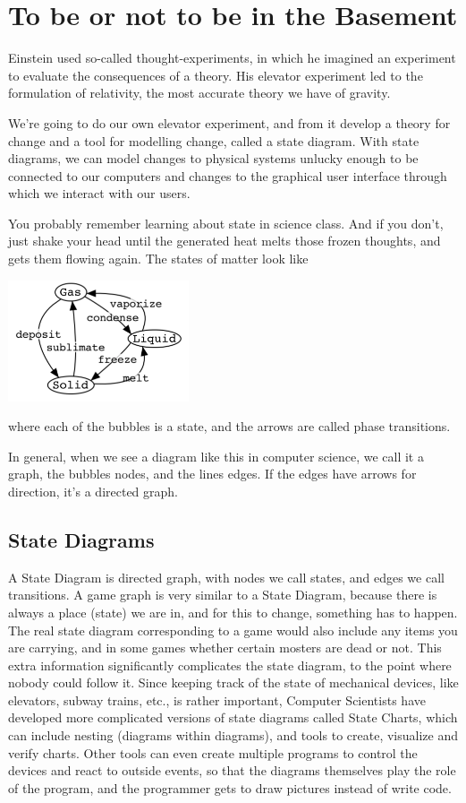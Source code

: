 \documentclass[12pt]{amsbook}
\begin{document}
\chapter{To be or not to be in the Basement}
%
Einstein used so-called thought-experiments,
in which he imagined an experiment to evaluate 
the consequences of a theory.
His elevator experiment led to the formulation
of relativity, the most accurate theory we have of gravity.

We're going to do our own elevator experiment, and from it develop a theory for change and a tool for modelling change, called a state diagram.
With state diagrams, we can model changes to physical systems unlucky enough to be connected to our computers and changes to the graphical user interface through which we interact with our users.

You probably remember learning about state in science class.
And if you don't, just shake your head until the generated heat melts those frozen thoughts, and gets them flowing again.
The states of matter look like
\begin{center}
\includegraphics[width=0.4\textwidth]{gasLiquidSolid.png}
\end{center}
where each of the bubbles is a state,
and the arrows are called phase transitions.

In general, when we see a diagram like this in computer science, we call it a graph, the bubbles nodes, and the lines edges.
If the edges have arrows for direction,
it's a directed graph.


\section{State Diagrams}
A State Diagram is directed graph, with nodes we call states, 
and edges we call transitions.
A game graph is very similar to a State Diagram, because there is always a place (state) we are in,
and for this to change, something has to happen.
The real state diagram corresponding to a game would also include any 
items you are carrying, and in some games whether certain mosters are 
dead or not.
This extra information significantly complicates the state diagram,
to the point where nobody could follow it.
Since keeping track of the state of mechanical devices, like elevators,
subway trains, etc., is rather important,
Computer Scientists have developed more complicated versions of state diagrams
called State Charts, which can include nesting (diagrams within diagrams),
and tools to create, visualize and verify charts.
Other tools can even create multiple programs to control the devices and
react to outside events, so that the diagrams themselves play the role of
the program, and the programmer gets to draw pictures instead of write code.
\end{document}
